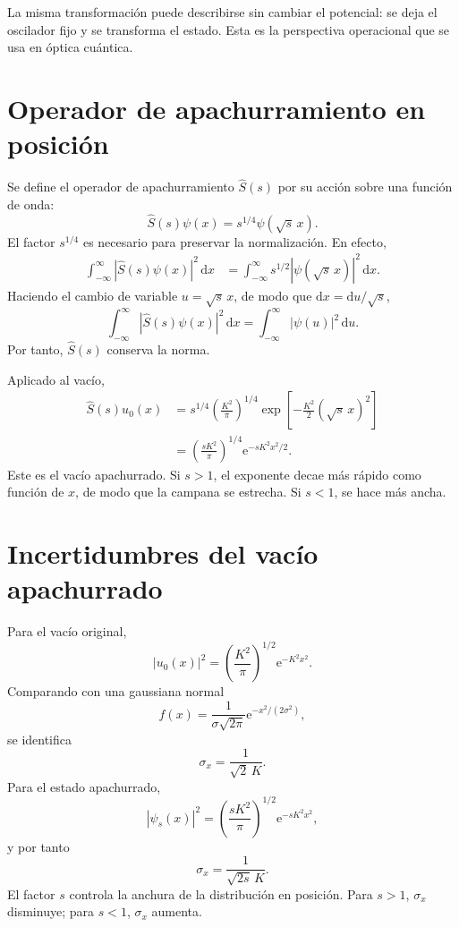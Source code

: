 \documentclass[11pt]{article}
\newcommand{\ee}{\mathrm{e}}
\newcommand{\dd}{\mathrm{d}}
\begin{document}
La misma transformaci\'on puede describirse sin cambiar el potencial: se deja
el oscilador fijo y se transforma el estado. Esta es la perspectiva
operacional que se usa en \'optica cu\'antica.

\section{Operador de apachurramiento en posici\'on}

Se define el operador de apachurramiento $\hat S(s)$ por su acci\'on sobre una
funci\'on de onda:
\begin{equation}
  \boxed{
  \hat S(s)\psi(x)=s^{1/4}\psi(\sqrt{s}\,x).
  }
\end{equation}
El factor $s^{1/4}$ es necesario para preservar la normalizaci\'on. En efecto,
\begin{align}
  \int_{-\infty}^{\infty}|\hat S(s)\psi(x)|^2\,\dd x
  &=
  \int_{-\infty}^{\infty}
  s^{1/2}|\psi(\sqrt{s}\,x)|^2\,\dd x.
\end{align}
Haciendo el cambio de variable $u=\sqrt{s}\,x$, de modo que
$\dd x=\dd u/\sqrt{s}$,
\begin{equation}
  \int_{-\infty}^{\infty}|\hat S(s)\psi(x)|^2\,\dd x
  =
  \int_{-\infty}^{\infty}|\psi(u)|^2\,\dd u.
\end{equation}
Por tanto, $\hat S(s)$ conserva la norma.

Aplicado al vac\'io,
\begin{align}
  \hat S(s)u_0(x)
  &=
  s^{1/4}
  \left(\frac{K^2}{\pi}\right)^{1/4}
  \exp\left[-\frac{K^2}{2}(\sqrt{s}\,x)^2\right]\\
  &=
  \left(\frac{sK^2}{\pi}\right)^{1/4}
  \ee^{-sK^2x^2/2}.
\end{align}
Este es el vac\'io apachurrado. Si $s>1$, el exponente decae m\'as r\'apido
como funci\'on de $x$, de modo que la campana se estrecha. Si $s<1$, se hace
m\'as ancha.

\section{Incertidumbres del vac\'io apachurrado}

Para el vac\'io original,
\begin{equation}
  |u_0(x)|^2
  =
  \left(\frac{K^2}{\pi}\right)^{1/2}
  \ee^{-K^2x^2}.
\end{equation}
Comparando con una gaussiana normal
\begin{equation}
  f(x)=\frac{1}{\sigma\sqrt{2\pi}}
  \ee^{-x^2/(2\sigma^2)},
\end{equation}
se identifica
\begin{equation}
  \sigma_x=\frac{1}{\sqrt2\,K}.
\end{equation}
Para el estado apachurrado,
\begin{equation}
  |\psi_s(x)|^2
  =
  \left(\frac{sK^2}{\pi}\right)^{1/2}
  \ee^{-sK^2x^2},
\end{equation}
y por tanto
\begin{equation}
  \boxed{
  \sigma_x=\frac{1}{\sqrt{2s}\,K}.
  }
\end{equation}
El factor $s$ controla la anchura de la distribuci\'on en posici\'on. Para
$s>1$, $\sigma_x$ disminuye; para $s<1$, $\sigma_x$ aumenta.
\end{document}
